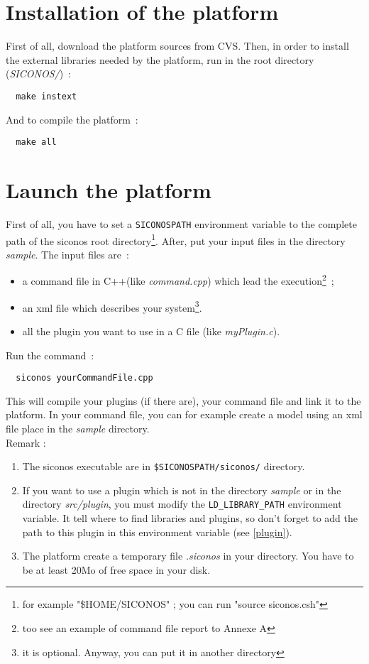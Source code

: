 \section{Installation of the platform}

First of all, download the platform sources from CVS. Then, in order to install the external libraries needed by the platform, run in the root directory (\textit{SICONOS/})~:
\begin{verbatim}
  make instext
\end{verbatim}
And to compile the platform~:
\begin{verbatim}
  make all
\end{verbatim}

\section{Launch the platform}\label{run}
First of all, you have to set a \verb+SICONOSPATH+ environment variable to the complete path of the siconos root directory\footnote{for example "\$HOME/SICONOS" ; you can run "source siconos.csh"}. After, put your input files in the directory \textit{sample}. The input files are~:
\begin{itemize}
\item a command file in C++(like \textit{command.cpp}) which lead the execution\footnote{too see an example of command file report to Annexe A}~;
\item an \ac{xml} file which describes your system\footnote{it is optional. Anyway, you can put it in another directory}.
\item all the plugin you want to use in a C file (like \textit{myPlugin.c}).
\end{itemize}
Run the command~: 
\begin{verbatim}
  siconos yourCommandFile.cpp
\end{verbatim}
This will compile your plugins (if there are), your command file and link it to the platform.
In your command file, you can for example create a model using an \ac{xml} file place in the \textit{sample} directory.\\

Remark :
\begin{enumerate}
\item The siconos executable are in  \verb+$SICONOSPATH/siconos/+ directory.\\
\item If you want to use a plugin which is not in the directory \textit{sample} or in the directory \textit{src/plugin}, you must modify the \verb+LD_LIBRARY_PATH+ environment variable. It tell where to find libraries and plugins, so don't forget to add the path to this plugin in this environment variable (see \ref{plugin}).
\item The platform create a temporary file \textit{.siconos} in your directory. You have to be at least 20Mo of free space in your disk.  
\end{enumerate}


